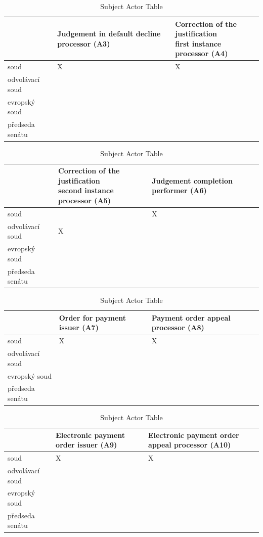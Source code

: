\begin{landscape}
\begin{table}[h]
\caption{Subject Actor Table}
\label{tab:subjectactortable}
\begin{tabular}{|l|l|l|}
\hline
  & Judgement in default decline processor (A3)  &  \thead{Correction of the justification\\ first instance processor (A4)}   \\ \hline
soud & X & X  \\ \hline
odvolávací soud &  &   \\ \hline
evropský soud &  &  \\ \hline
předseda senátu &  &   \\ \hline
\end{tabular}
\end{table}

\begin{table}[h]
\caption{Subject Actor Table}
\label{tab:subjectactortable}
\begin{tabular}{|l|l|l|}
\hline
  &  \thead{Correction of the justification\\ second instance processor (A5)}  &  Judgement completion performer (A6)   \\ \hline
soud &   & X  \\ \hline
odvolávací soud & X &   \\ \hline
evropský soud &  &  \\ \hline
předseda senátu &  &  \\ \hline
\end{tabular}
\end{table}

\begin{table}[h]
\caption{Subject Actor Table}
\label{tab:subjectactortable}
\begin{tabular}{|l|l|l|}
\hline
  &  Order for payment issuer (A7)  &  Payment order appeal processor (A8)    \\ \hline
soud &  X & X \\ \hline
odvolávací soud &   &  \\ \hline
evropský soud &  &  \\ \hline
předseda senátu &  &  \\ \hline
\end{tabular}
\end{table}

\begin{table}[h]
\caption{Subject Actor Table}
\label{tab:subjectactortable}
\begin{tabular}{|l|l|l|}
\hline
  &  Electronic payment order issuer (A9)  &  Electronic payment order appeal processor (A10) \\ \hline
soud &  X & X   \\ \hline
odvolávací soud &  &  \\ \hline
evropský soud &  &  \\ \hline
předseda senátu & &   \\ \hline
\end{tabular}
\end{table}


\end{landscape}

